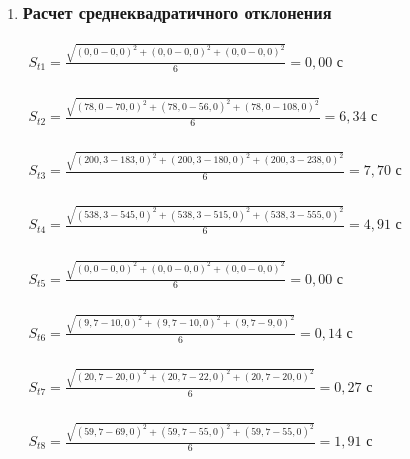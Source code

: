 \begin{enumerate}
		\item \subsubsection*{Расчет среднеквадратичного отклонения}
		\label{appendix: 12}
		\(\begin{aligned}S_{t 1} = \frac{\sqrt{(0,0 - 0,0)^2 + (0,0 - 0,0)^2 + (0,0 - 0,0)^2}}{6} = 0,00 \text{ с} \end{aligned}\) \\\\
		\(\begin{aligned}S_{t 2} = \frac{\sqrt{(78,0 - 70,0)^2 + (78,0 - 56,0)^2 + (78,0 - 108,0)^2}}{6} = 6,34 \text{ с} \end{aligned}\) \\\\ 
		\(\begin{aligned}S_{t 3} = \frac{\sqrt{(200,3 - 183,0)^2 + (200,3 - 180,0)^2 + (200,3 - 238,0)^2}}{6} = 7,70 \text{ с} \end{aligned}\) \\\\ 
		\(\begin{aligned}S_{t 4} = \frac{\sqrt{(538,3 - 545,0)^2 + (538,3 - 515,0)^2 + (538,3 - 555,0)^2}}{6} = 4,91 \text{ с} \end{aligned}\) \\\\ 
		\(\begin{aligned}S_{t 5} = \frac{\sqrt{(0,0 - 0,0)^2 + (0,0 - 0,0)^2 + (0,0 - 0,0)^2}}{6} = 0,00 \text{ с} \end{aligned}\) \\\\ 
		\(\begin{aligned}S_{t 6} = \frac{\sqrt{(9,7 - 10,0)^2 + (9,7 - 10,0)^2 + (9,7 - 9,0)^2}}{6} = 0,14 \text{ с} \end{aligned}\) \\\\ 
		\(\begin{aligned}S_{t 7} = \frac{\sqrt{(20,7 - 20,0)^2 + (20,7 - 22,0)^2 + (20,7 - 20,0)^2}}{6} = 0,27 \text{ с} \end{aligned}\) \\\\ 
		\(\begin{aligned}S_{t 8} = \frac{\sqrt{(59,7 - 69,0)^2 + (59,7 - 55,0)^2 + (59,7 - 55,0)^2}}{6} = 1,91 \text{ с} \end{aligned}\) \\\\
		

\end{enumerate}
